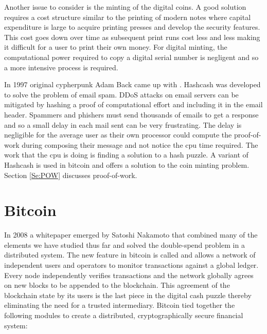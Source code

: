 Another issue to consider is the minting of the digital coins. A good solution requires a cost structure similar to the printing of modern notes where capital expenditure is large to acquire printing presses and develop the security features. This cost goes down over time as subsequent print runs cost less and less making it difficult for a user to print their own money. For digital minting, the computational power required to copy a digital serial number is negligent and so a more intensive process is required.

In 1997 original cypherpunk Adam Back came up with . Hashcash was developed to solve the problem of email spam. DDoS attacks on email servers can be mitigated by hashing a proof of computational effort and including it in the email header. Spammers and phishers must send thousands of emails to get a response and so a small delay in each mail sent can be very frustrating. The delay is negligible for the average user as their own processor could compute the proof-of-work during composing their message and not notice the cpu time required. The work that the cpu is doing is finding a solution to a hash puzzle. A variant of Hashcash is used in bitcoin and offers a solution to the coin minting problem. Section \ref{Se:POW} discusses proof-of-work.


\section{Bitcoin}\label{Se:bitcoin}

In 2008 a whitepaper emerged by Satoshi Nakamoto that combined many of the elements we have studied thus far and solved the double-spend problem in a distributed system. The new feature in bitcoin is called  and allows a network of independent users and operators to monitor transactions against a global ledger. Every node independently verifies transactions and the network globally agrees on new blocks to be appended to the blockchain. This agreement of the blockchain state by its users is the last piece in the digital cash puzzle thereby eliminating the need for a trusted intermediary. Bitcoin tied together the following modules to create a distributed, cryptographically secure financial system:


